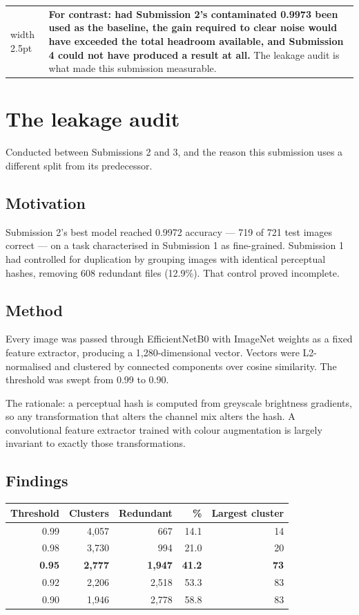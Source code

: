 \documentclass[11pt,a4paper]{article}
\makeatletter
\newenvironment{keybox}
  {\par\medskip\noindent\begin{tabular}{@{}p{0.3em}@{\hspace{0.8em}}p{\dimexpr\linewidth-2.2em}@{}}
   {\color{black}\vrule width 2.5pt} &}
  {\end{tabular}\par\medskip}
\makeatother
\begin{document}
\begin{keybox}
\textbf{For contrast: had Submission 2's contaminated 0.9973 been used as the baseline,
the gain required to clear noise would have exceeded the total headroom available, and
Submission 4 could not have produced a result at all.} The leakage audit is what made
this submission measurable.
\end{keybox}

\section{The leakage audit}
\label{sec:audit}

Conducted between Submissions 2 and 3, and the reason this submission uses a different
split from its predecessor.

\subsection{Motivation}

Submission 2's best model reached 0.9972 accuracy --- 719 of 721 test images correct ---
on a task characterised in Submission 1 as fine-grained. Submission 1 had controlled for
duplication by grouping images with identical perceptual hashes, removing 608 redundant
files (12.9\%). That control proved incomplete.

\subsection{Method}

Every image was passed through EfficientNetB0 with ImageNet weights as a fixed feature
extractor, producing a 1,280-dimensional vector. Vectors were L2-normalised and clustered
by connected components over cosine similarity. The threshold was swept from 0.99 to
0.90.

The rationale: a perceptual hash is computed from greyscale brightness gradients, so any
transformation that alters the channel mix alters the hash. A convolutional feature
extractor trained with colour augmentation is largely invariant to exactly those
transformations.

\subsection{Findings}

\begin{center}
\begin{tabular}{@{}rrrrr@{}}
\toprule
\textbf{Threshold} & \textbf{Clusters} & \textbf{Redundant} & \textbf{\%} & \textbf{Largest cluster} \\
\midrule
0.99 & 4,057 & 667 & 14.1 & 14 \\
0.98 & 3,730 & 994 & 21.0 & 20 \\
\textbf{0.95} & \textbf{2,777} & \textbf{1,947} & \textbf{41.2} & \textbf{73} \\
0.92 & 2,206 & 2,518 & 53.3 & 83 \\
0.90 & 1,946 & 2,778 & 58.8 & 83 \\
\bottomrule
\end{tabular}
\end{center}
\end{document}
